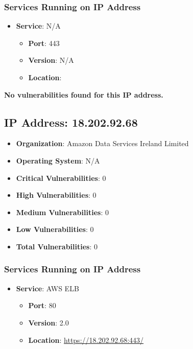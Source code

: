 \documentclass{article}
\begin{document}
\subsubsection*{Services Running on IP Address}

\begin{itemize}
    
        \item \textbf{Service}: N/A
        \begin{itemize}
            \item \textbf{Port}: 443
            \item \textbf{Version}:  N/A 
            \item \textbf{Location}: \href{  }{  }
        \end{itemize}
    
\end{itemize}


\textbf{No vulnerabilities found for this IP address.}




\clearpage



\subsection{IP Address: 18.202.92.68}

\begin{itemize}
    \item \textbf{Organization}: Amazon Data Services Ireland Limited
    \item \textbf{Operating System}:  N/A 
    \item \textbf{Critical Vulnerabilities}: 0
    \item \textbf{High Vulnerabilities}: 0
    \item \textbf{Medium Vulnerabilities}: 0
    \item \textbf{Low Vulnerabilities}: 0
    \item \textbf{Total Vulnerabilities}: 0
\end{itemize}

\subsubsection*{Services Running on IP Address}

\begin{itemize}
    
        \item \textbf{Service}: AWS ELB
        \begin{itemize}
            \item \textbf{Port}: 80
            \item \textbf{Version}:  2.0 
            \item \textbf{Location}: \href{ https://18.202.92.68:443/ }{ https://18.202.92.68:443/ }
        \end{itemize}
    
\end{itemize}
\end{document}
